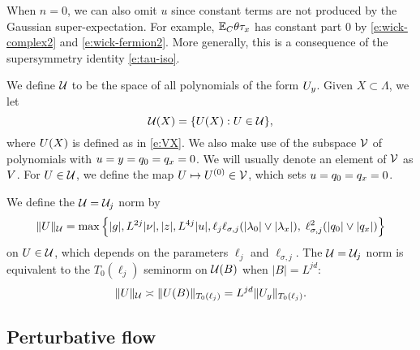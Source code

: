 \begin{rk}
\label{rk:noconst}
When $n = 0$, we can also omit $u$ since constant terms are not produced by the 
Gaussian super-expectation. For example, $\mathbb{E}_C\theta \tau_x$ has constant part
$0$ by \eqref{e:wick-complex2} and \eqref{e:wick-fermion2}. More generally,
this is a consequence of the supersymmetry identity \eqref{e:tau-iso}.
\end{rk}

We define $\mathcal{U}$ to be the space of all polynomials of the form $U_y$.
Given $X \subset \Lambda$, we let
\begin{equation}
\label{e:Vcalesig}
\mathcal{U}(X) = \{U(X) : U \in \mathcal{U} \},
\end{equation}
where $U(X)$ is defined as in \eqref{e:VX}.
We also make use of the %
subspace $\mathcal{V}$ of polynomials with
$u = y = q_0=q_x = 0$.
We will usually denote an element of $\mathcal{V}$ as $V$.
For $U \in \mathcal{U}$, we define %
the map $U \mapsto U^{(0)} \in \mathcal{V}$, which sets
$u = q_0 = q_x = 0$.

We define the $\mathcal{U} = \mathcal{U}_j$ norm by
\begin{equation}
\label{e:Vnormdef}
\|U\|_{\mathcal{U}}
	=
\max
\Big\{
	|g|, L^{2j}|\nu|, |z|, L^{4j}|u|,
	\ell_j\ell_{\sigma,j}(|\lambda_0|\vee|\lambda_x|), \;
	\ell_{\sigma,j}^{2} (|q_0|\vee|q_x|)
\Big\}
\end{equation}
on $U \in \mathcal{U}$, which depends on the parameters $\ell_j$ and $\ell_{\sigma,j}$.
The $\mathcal{U} = \mathcal{U}_j$ norm is equivalent to the $T_0(\ell_j)$ seminorm on $\mathcal{U}(B)$
when $|B| = L^{jd}$:
\begin{equation}
\|U\|_{\mathcal{U}} \asymp \|U(B)\|_{T_0(\ell_j)} = L^{jd} \|U_y\|_{T_0(\ell_j)}.
\end{equation}


\subsection{Perturbative flow}
\label{sec:pt}

